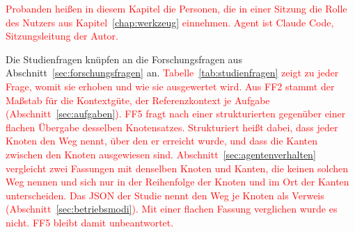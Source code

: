 \textcolor{red}{Probanden heißen in diesem Kapitel die Personen, die in einer Sitzung die Rolle des Nutzers aus Kapitel~\ref{chap:werkzeug} einnehmen. Agent ist Claude Code, Sitzungsleitung der Autor.}

Die Studienfragen knüpfen an die Forschungsfragen aus Abschnitt~\ref{sec:forschungsfragen} an. \textcolor{red}{Tabelle~\ref{tab:studienfragen} zeigt zu jeder Frage, womit sie erhoben und wie sie ausgewertet wird. Aus FF2 stammt der Maßstab für die Kontextgüte, der Referenzkontext je Aufgabe (Abschnitt~\ref{sec:aufgaben}). FF5 fragt nach einer strukturierten gegenüber einer flachen Übergabe desselben Knotensatzes. Strukturiert heißt dabei, dass jeder Knoten den Weg nennt, über den er erreicht wurde, und dass die Kanten zwischen den Knoten ausgewiesen sind. Abschnitt~\ref{sec:agentenverhalten} vergleicht zwei Fassungen mit denselben Knoten und Kanten, die keinen solchen Weg nennen und sich nur in der Reihenfolge der Knoten und im Ort der Kanten unterscheiden. Das JSON der Studie nennt den Weg je Knoten als Verweis (Abschnitt~\ref{sec:betriebsmodi}). Mit einer flachen Fassung verglichen wurde es nicht. FF5 bleibt damit unbeantwortet.}

